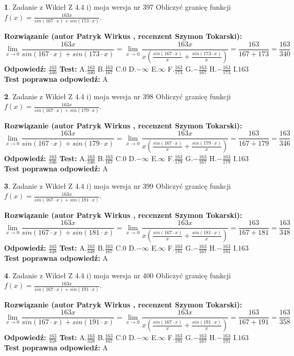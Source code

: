 \documentclass[12pt, a4paper]{article}
\theoremstyle{definition} %
\newtheorem{zad}{}
\newcommand{\zadStart}[1]{\begin{zad}#1\newline}
\newcommand{\zadStop}{\end{zad}}
\newcommand{\rozwStart}[2]{\noindent \textbf{Rozwiązanie (autor #1 , recenzent #2): }\newline}
\newcommand{\rozwStop}{\newline}
\newcommand{\odpStart}{\noindent \textbf{Odpowiedź:}\newline}
\newcommand{\odpStop}{\newline}
\newcommand{\testStart}{\noindent \textbf{Test:}\newline}
\newcommand{\testStop}{\newline}
\newcommand{\kluczStart}{\noindent \textbf{Test poprawna odpowiedź:}\newline}
\newcommand{\kluczStop}{\newline}
\begin{document}
\zadStart{Zadanie z Wikieł Z 4.4 i) moja wersja nr 397}
Obliczyć granicę funkcji $f(x)=\frac{163x}{sin(167\cdot x) +sin(173\cdot x)}$.
\zadStop
\rozwStart{Patryk Wirkus}{Szymon Tokarski}
$$\lim\limits_{x\to 0}\frac{163x}{sin(167\cdot x) +sin(173\cdot x)}=\lim\limits_{x\to 0}\frac{163x}{x(\frac{sin(167\cdot x)}{x}+\frac{sin(173\cdot x)}{x})}=\frac{163}{167+173} = \frac{163}{340}$$
\rozwStop
\odpStart
$\frac{163}{340}$
\odpStop
\testStart
A.$\frac{163}{340}$
B.$\frac{163}{167}$
C.$0$
D.$-\infty$
E.$\infty$
F.$\frac{163}{173}$
G.$-\frac{163}{167}$
H.$-\frac{163}{173}$
I.$163$
\testStop
\kluczStart
A
\kluczStop



\zadStart{Zadanie z Wikieł Z 4.4 i) moja wersja nr 398}
Obliczyć granicę funkcji $f(x)=\frac{163x}{sin(167\cdot x) +sin(179\cdot x)}$.
\zadStop
\rozwStart{Patryk Wirkus}{Szymon Tokarski}
$$\lim\limits_{x\to 0}\frac{163x}{sin(167\cdot x) +sin(179\cdot x)}=\lim\limits_{x\to 0}\frac{163x}{x(\frac{sin(167\cdot x)}{x}+\frac{sin(179\cdot x)}{x})}=\frac{163}{167+179} = \frac{163}{346}$$
\rozwStop
\odpStart
$\frac{163}{346}$
\odpStop
\testStart
A.$\frac{163}{346}$
B.$\frac{163}{167}$
C.$0$
D.$-\infty$
E.$\infty$
F.$\frac{163}{179}$
G.$-\frac{163}{167}$
H.$-\frac{163}{179}$
I.$163$
\testStop
\kluczStart
A
\kluczStop



\zadStart{Zadanie z Wikieł Z 4.4 i) moja wersja nr 399}
Obliczyć granicę funkcji $f(x)=\frac{163x}{sin(167\cdot x) +sin(181\cdot x)}$.
\zadStop
\rozwStart{Patryk Wirkus}{Szymon Tokarski}
$$\lim\limits_{x\to 0}\frac{163x}{sin(167\cdot x) +sin(181\cdot x)}=\lim\limits_{x\to 0}\frac{163x}{x(\frac{sin(167\cdot x)}{x}+\frac{sin(181\cdot x)}{x})}=\frac{163}{167+181} = \frac{163}{348}$$
\rozwStop
\odpStart
$\frac{163}{348}$
\odpStop
\testStart
A.$\frac{163}{348}$
B.$\frac{163}{167}$
C.$0$
D.$-\infty$
E.$\infty$
F.$\frac{163}{181}$
G.$-\frac{163}{167}$
H.$-\frac{163}{181}$
I.$163$
\testStop
\kluczStart
A
\kluczStop



\zadStart{Zadanie z Wikieł Z 4.4 i) moja wersja nr 400}
Obliczyć granicę funkcji $f(x)=\frac{163x}{sin(167\cdot x) +sin(191\cdot x)}$.
\zadStop
\rozwStart{Patryk Wirkus}{Szymon Tokarski}
$$\lim\limits_{x\to 0}\frac{163x}{sin(167\cdot x) +sin(191\cdot x)}=\lim\limits_{x\to 0}\frac{163x}{x(\frac{sin(167\cdot x)}{x}+\frac{sin(191\cdot x)}{x})}=\frac{163}{167+191} = \frac{163}{358}$$
\rozwStop
\odpStart
$\frac{163}{358}$
\odpStop
\testStart
A.$\frac{163}{358}$
B.$\frac{163}{167}$
C.$0$
D.$-\infty$
E.$\infty$
F.$\frac{163}{191}$
G.$-\frac{163}{167}$
H.$-\frac{163}{191}$
I.$163$
\testStop
\kluczStart
A
\kluczStop
\end{document}
